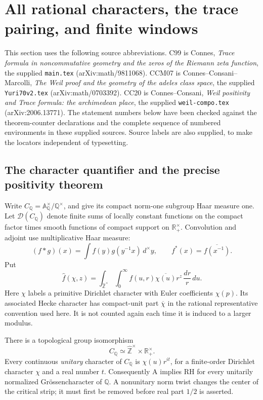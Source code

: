 \section{All rational characters, the trace pairing, and finite windows}
\label{sec:trace-windows}

This section uses the following source abbreviations. C99 is Connes,
\emph{Trace formula in noncommutative geometry and the zeros of the
Riemann zeta function}, the supplied \texttt{main.tex}
(arXiv:math/9811068). CCM07 is Connes--Consani--Marcolli,
\emph{The Weil proof and the geometry of the adeles class space},
the supplied \texttt{Yuri70v2.tex} (arXiv:math/0703392).
CC20 is Connes--Consani, \emph{Weil positivity and Trace formula:
the archimedean place}, the supplied \texttt{weil-compo.tex}
(arXiv:2006.13771). The statement numbers below have been checked
against the theorem-counter declarations and the complete sequence
of numbered environments in these supplied sources. Source labels
are also supplied, to make the locators independent of typesetting.

\subsection{The character quantifier and the precise positivity theorem}

Write \(C_{\mathbb Q}=\mathbb A_{\mathbb Q}^{\times}/\mathbb Q^\times\),
and give its compact norm-one subgroup Haar measure one. Let
\(\mathcal D(C_{\mathbb Q})\) denote finite sums of locally constant
functions on the compact factor times smooth functions of compact
support on \(\mathbb R_+^\times\). Convolution and adjoint use
multiplicative Haar measure:
\[
 (f*g)(x)=\int f(y)g(y^{-1}x)\,d^\times y,\qquad
 f^*(x)=\overline{f(x^{-1})}.
\]
Put
\[
 \widehat f(\chi,z)=
 \int_{\widehat{\mathbb Z}^{\times}}\int_0^\infty
 f(u,r)\overline{\chi(u)}r^z\,\frac{dr}{r}\,du .
\]
Here \(\chi\) labels a primitive Dirichlet character with
Euler coefficients \(\chi(p)\). Its associated Hecke character
has compact-unit part \(\overline\chi\) in the rational
representative convention used here. It is not counted again
each time it is induced to a larger modulus.

\begin{proposition}
\label{AC-T01}
There is a topological group isomorphism
\[
 C_{\mathbb Q}\simeq\widehat{\mathbb Z}^{\times}\times
 \mathbb R_+^\times .
\]
Every continuous \emph{unitary} character of \(C_{\mathbb Q}\) is
\(\chi(u)r^{it}\), for a finite-order Dirichlet character \(\chi\)
and a real number \(t\). Consequently A implies RH for every
unitarily normalized Gr\"ossencharacter of \(\mathbb Q\).
A nonunitary norm twist changes the center of the critical strip;
it must first be removed before real part \(1/2\) is asserted.
\end{proposition}

